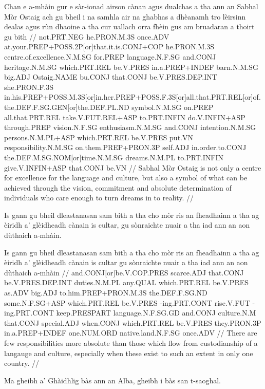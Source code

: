 \documentclass[a4paper,10pt]{article}
\begin{document}
\vspace{4mm}
\gla Chan e a-mhàin gur e sàr-ionad airson cànan agus dualchas a tha {ann an} Sabhal Mòr Ostaig ach gu bheil i na samhla air na ghabhas a dhèanamh tro lèirsinn dealas agus rùn dhaoine a tha cur uallach orra fhèin gus am bruadaran a thoirt gu bith  //
\glb not.PRT.NEG he.PRON.M.3S once.ADV at.your.PREP+POSS.2P[or]that.it.is.CONJ+COP he.PRON.M.3S centre.of.excellence.N.M.SG for.PREP language.N.F.SG and.CONJ heritage.N.M.SG which.PRT.REL be.V.PRES in.a.PREP+INDEF barn.N.M.SG big.ADJ Ostaig.NAME bu.CONJ that.CONJ be.V.PRES.DEP.INT she.PRON.F.3S in.his.PREP+POSS.M.3S[or]in.her.PREP+POSS.F.3S[or]all.that.PRT.REL[or]of.the.DEF.F.SG.GEN[or]the.DEF.PL.ND symbol.N.M.SG on.PREP all.that.PRT.REL take.V.FUT.REL+ASP to.PRT.INFIN do.V.INFIN+ASP through.PREP vision.N.F.SG enthusiasm.N.M.SG and.CONJ intention.N.M.SG persons.N.M.PL+ASP which.PRT.REL be.V.PRES put.VN responsibility.N.M.SG on.them.PREP+PRON.3P self.ADJ in.order.to.CONJ the.DEF.M.SG.NOM[or]time.N.M.SG dreams.N.M.PL to.PRT.INFIN give.V.INFIN+ASP that.CONJ be.VN  //
\glft Sabhal Mòr Ostaig is not only a centre for excellence for the language and culture, but also a symbol of what can be achieved through the vision, commitment and absolute determination of individuals who care enough to turn dreams in to reality. //
\endgl
\xe

\ex
\begingl
\glpre Is gann gu bheil dleastanasan sam bith a tha cho mòr ris an fheadhainn a tha ag èiridh a' glèidheadh cànain is cultar, gu sònraichte nuair a tha iad ann an aon dùthaich a-mhàin. 

\vspace{4mm}
\gla Is gann gu bheil dleastanasan {sam bith} a tha cho mòr ris an fheadhainn a tha ag èiridh a' glèidheadh cànain is cultar gu sònraichte nuair a tha iad {ann an} aon dùthaich a-mhàin  //
\glb and.CONJ[or]be.V.COP.PRES scarce.ADJ that.CONJ be.V.PRES.DEP.INT duties.N.M.PL any.QUAL which.PRT.REL be.V.PRES as.ADV big.ADJ to.him.PREP+PRON.M.3S the.DEF.F.SG.ND some.N.F.SG+ASP which.PRT.REL be.V.PRES -ing.PRT.CONT rise.V.FUT -ing.PRT.CONT keep.PRESPART language.N.F.SG.GD and.CONJ culture.N.M that.CONJ special.ADJ when.CONJ which.PRT.REL be.V.PRES they.PRON.3P in.a.PREP+INDEF one.NUM.ORD native.land.N.F.SG once.ADV  //
\glft There are few responsibilities more absolute than those which flow from custodianship of a langauge and culture, especially when these exist to such an extent in only one country. //
\endgl
\xe

\ex
\begingl
\glpre Ma gheibh a' Ghàidhlig bàs ann an Alba, gheibh i bàs san t-saoghal. 
\end{document}
